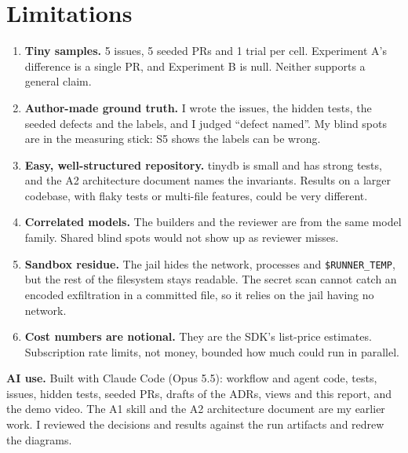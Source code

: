 \documentclass[11pt,a4paper]{article}
\begin{document}
\section{Limitations}
\begin{enumerate}
\item \textbf{Tiny samples.} 5 issues, 5 seeded PRs and 1 trial per cell. Experiment A's difference
is a single PR, and Experiment B is null. Neither supports a general claim.
\item \textbf{Author-made ground truth.} I wrote the issues, the hidden tests, the seeded defects and
the labels, and I judged ``defect named''. My blind spots are in the measuring stick: S5 shows the
labels can be wrong.
\item \textbf{Easy, well-structured repository.} tinydb is small and has strong tests, and the A2
architecture document names the invariants. Results on a larger codebase, with flaky tests or
multi-file features, could be very different.
\item \textbf{Correlated models.} The builders and the reviewer are from the same model family.
Shared blind spots would not show up as reviewer misses.
\item \textbf{Sandbox residue.} The jail hides the network, processes and \texttt{\$RUNNER\_TEMP}, but
the rest of the filesystem stays readable. The secret scan cannot catch an encoded exfiltration in a
committed file, so it relies on the jail having no network.
\item \textbf{Cost numbers are notional.} They are the SDK's list-price estimates. Subscription rate
limits, not money, bounded how much could run in parallel.
\end{enumerate}

\textbf{AI use.} Built with Claude Code (Opus 5.5): workflow and agent code, tests, issues, hidden tests,
seeded PRs, drafts of the ADRs, views and this report, and the demo video. The A1 skill and the A2
architecture document are my earlier work. I reviewed the decisions and results against the run
artifacts and redrew the diagrams.
\end{document}
